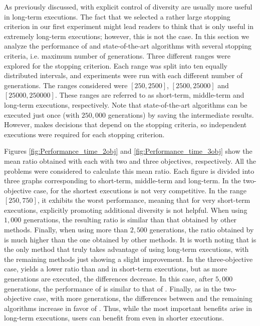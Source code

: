 As previously discussed, \EAS{} with explicit control of diversity are usually more useful in long-term executions.
%
The fact that we selected a rather large stopping criterion in our first experiment might lead readers to think that \VSDMOEA{} is only
useful in extremely long-term executions;
%
however, this is not the case.
%
In this section we analyze the performance of \VSDMOEA{} and state-of-the-art algorithms with several stopping criteria, 
i.e. maximum number of generations.
%
Three different ranges were explored for the stopping criterion.
%
Each range was split into ten equally distributed intervals, and experiments were run with each different number of generations.
%
The ranges considered were $[250, 2500]$, $[2500, 25000]$ and $[25000, 250000]$.
%
These ranges are referred to as short-term, middle-term and long-term executions, respectively.
%
Note that state-of-the-art algorithms can be executed just once (with $250,000$ generations) by saving the intermediate results.
%
However, \VSDMOEA{} makes decisions that depend on the stopping criteria, so independent executions were required for each stopping criterion.

Figures \ref{fig:Performance_time_2obj} and \ref{fig:Performance_time_3obj} show the mean \HV{} ratio obtained with each \MOEA{} with two and three objectives, respectively.
%
All the problems were considered to calculate this mean ratio.
%
Each figure is divided into three graphs corresponding to short-term, middle-term and long-term.
%
In the two-objective case, for the shortest executions \VSDMOEA{} is not very competitive.
%
In the range $[250, 750]$, it exhibits the worst performance, meaning that for very short-term executions,
explicitly promoting additional diversity is not helpful.
%
When using $1,000$ generations, the resulting \HV{} ratio is similar than that obtained by other methods.
%
Finally, when using more than $2,500$ generations, the \HV{} ratio obtained by \VSDMOEA{} is much higher than the one
obtained by other methods.
%
It is worth noting that \VSDMOEA{} is the only method that truly takes advantage of using long-term executions,
with the remaining methods just showing a slight improvement.
%
In the three-objective case, \VSDMOEA{} yields a lower \HV{} ratio than \RMOEA{} and \MOEAD{} in short-term executions,
but as more generations are executed, the differences decrease.
%
In this case, after $5,000$ generations, the performance of \VSDMOEA{} is similar to that of \RMOEA{}.
%
Finally, as in the two-objective case, with more generations, the differences between \VSDMOEA{} and the remaining
algorithms increase in favor of \VSDMOEA{}.
%
Thus, while the most important benefits arise in long-term executions, users can benefit from \VSDMOEA{} even in shorter executions.


